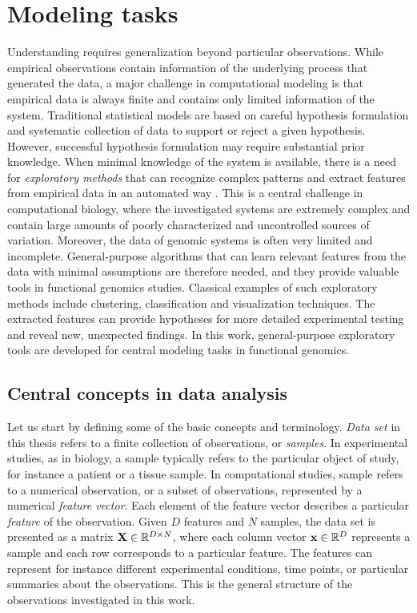 \section{Modeling tasks}\label{sec:tasks}

Understanding requires generalization beyond particular observations.
While empirical observations contain information of the underlying
process that generated the data, a major challenge in computational
modeling is that empirical data is always finite and contains only
limited information of the system. Traditional statistical models are
based on careful hypothesis formulation and systematic collection of
data to support or reject a given hypothesis. However, successful
hypothesis formulation may require substantial prior knowledge. When
minimal knowledge of the system is available, there is a need for {\it
  exploratory methods} that can recognize complex patterns and extract
features from empirical data in an automated way \citep{Baldi99}.
This is a central challenge in computational biology, where the
investigated systems are extremely complex and contain large amounts
of poorly characterized and uncontrolled sources of
variation. Moreover, the data of genomic systems is often very limited
and incomplete. General-purpose algorithms that can learn relevant
features from the data with minimal assumptions are therefore needed,
and they provide valuable tools in functional genomics
studies. Classical examples of such exploratory methods include
clustering, classification and visualization techniques. The extracted
features can provide hypotheses for more detailed experimental testing
and reveal new, unexpected findings. In this work, general-purpose
exploratory tools are developed for central modeling tasks in
functional genomics.

\subsection{Central concepts in data analysis}

Let us start by defining some of the basic concepts and terminology.
\emph{Data set} in this thesis refers to a finite collection of
observations, or {\it samples}. In experimental studies, as in
biology, a sample typically refers to the particular object of study,
for instance a patient or a tissue sample. In computational studies,
sample refers to a numerical observation, or a subset of observations,
represented by a numerical {\it feature vector}. Each element of the
feature vector describes a particular {\it feature} of the
observation. Given \(D\) features and \(N\) samples, the data set is
presented as a matrix $\mathbf{X} \in \mathbb{R}^{D \times N}$, where each column
vector $\mathbf{x} \in \mathbb{R}^D$ represents a sample and each row corresponds
to a particular feature. The features can represent for instance
different experimental conditions, time points, or particular
summaries about the observations. This is the general structure of the
observations investigated in this work.

